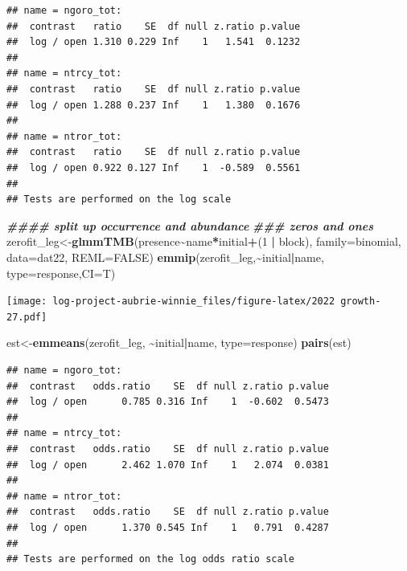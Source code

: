\documentclass[
]{article}
\newenvironment{Shaded}{\begin{snugshade}}{\end{snugshade}}
\newcommand{\AttributeTok}[1]{\textcolor[rgb]{0.13,0.29,0.53}{#1}}
\newcommand{\ConstantTok}[1]{\textcolor[rgb]{0.56,0.35,0.01}{#1}}
\newcommand{\DecValTok}[1]{\textcolor[rgb]{0.00,0.00,0.81}{#1}}
\newcommand{\DocumentationTok}[1]{\textcolor[rgb]{0.56,0.35,0.01}{\textbf{\textit{#1}}}}
\newcommand{\FunctionTok}[1]{\textcolor[rgb]{0.13,0.29,0.53}{\textbf{#1}}}
\newcommand{\NormalTok}[1]{#1}
\newcommand{\OtherTok}[1]{\textcolor[rgb]{0.56,0.35,0.01}{#1}}
\newcommand{\SpecialCharTok}[1]{\textcolor[rgb]{0.81,0.36,0.00}{\textbf{#1}}}
\newcommand{\StringTok}[1]{\textcolor[rgb]{0.31,0.60,0.02}{#1}}
\begin{document}
\begin{verbatim}
## name = ngoro_tot:
##  contrast   ratio    SE  df null z.ratio p.value
##  log / open 1.310 0.229 Inf    1   1.541  0.1232
## 
## name = ntrcy_tot:
##  contrast   ratio    SE  df null z.ratio p.value
##  log / open 1.288 0.237 Inf    1   1.380  0.1676
## 
## name = ntror_tot:
##  contrast   ratio    SE  df null z.ratio p.value
##  log / open 0.922 0.127 Inf    1  -0.589  0.5561
## 
## Tests are performed on the log scale
\end{verbatim}

\begin{Shaded}
\begin{Highlighting}[]
\DocumentationTok{\#\#\#\# split up occurrence and abundance}
\DocumentationTok{\#\#\# zeros and ones }
\NormalTok{zerofit\_leg}\OtherTok{\textless{}{-}}\FunctionTok{glmmTMB}\NormalTok{(presence}\SpecialCharTok{\textasciitilde{}}\NormalTok{name}\SpecialCharTok{*}\NormalTok{initial}\SpecialCharTok{+}\NormalTok{(}\DecValTok{1} \SpecialCharTok{|}\NormalTok{ block), }\AttributeTok{family=}\NormalTok{binomial, }\AttributeTok{data=}\NormalTok{dat22, }\AttributeTok{REML=}\ConstantTok{FALSE}\NormalTok{)}
\FunctionTok{emmip}\NormalTok{(zerofit\_leg,}\SpecialCharTok{\textasciitilde{}}\NormalTok{initial}\SpecialCharTok{|}\NormalTok{name, }\AttributeTok{type=}\StringTok{\textquotesingle{}response\textquotesingle{}}\NormalTok{,}\AttributeTok{CI=}\NormalTok{T)}
\end{Highlighting}
\end{Shaded}

\texttt{[image: log-project-aubrie-winnie\_files/figure-latex/2022 growth-27.pdf]}

\begin{Shaded}
\begin{Highlighting}[]
\NormalTok{est}\OtherTok{\textless{}{-}}\FunctionTok{emmeans}\NormalTok{(zerofit\_leg, }\SpecialCharTok{\textasciitilde{}}\NormalTok{initial}\SpecialCharTok{|}\NormalTok{name, }\AttributeTok{type=}\StringTok{\textquotesingle{}response\textquotesingle{}}\NormalTok{)}
\FunctionTok{pairs}\NormalTok{(est)}
\end{Highlighting}
\end{Shaded}

\begin{verbatim}
## name = ngoro_tot:
##  contrast   odds.ratio    SE  df null z.ratio p.value
##  log / open      0.785 0.316 Inf    1  -0.602  0.5473
## 
## name = ntrcy_tot:
##  contrast   odds.ratio    SE  df null z.ratio p.value
##  log / open      2.462 1.070 Inf    1   2.074  0.0381
## 
## name = ntror_tot:
##  contrast   odds.ratio    SE  df null z.ratio p.value
##  log / open      1.370 0.545 Inf    1   0.791  0.4287
## 
## Tests are performed on the log odds ratio scale
\end{verbatim}
\end{document}
